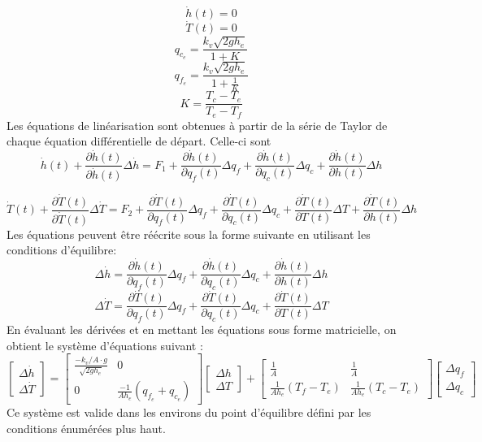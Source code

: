 \documentclass{udes_rapport} %
\begin{document}
\[ \dot{h}(t) = 0									\]
\[ \dot{T}(t) = 0									\]
\[	q_{c_e} = \frac{k_v \sqrt{2gh_e}}{1+K}			\]
\[	q_{f_e} = \frac{k_v \sqrt{2gh_e}}{1+\frac{1}{K}}\]
\[	K = \frac{T_c - T_e}{T_e -T_f} 					\]
Les équations de linéarisation sont obtenues à partir de la série de Taylor de chaque équation différentielle de départ. Celle-ci sont
\begin{equation}
\dot{h}(t) + \frac{\partial\dot{h}(t)}{\partial\dot{h}(t)}\Delta \dot h = F_1 + \frac{\partial\dot{h}(t)}{\partial q_f(t)}\Delta q_f + \frac{\partial\dot{h}(t)}{\partial q_c(t)}\Delta q_c + \frac{\partial\dot{h}(t)}{\partial h(t)}\Delta h
\end{equation}

\begin{equation}
\dot{T}(t) + \frac{\partial\dot{T}(t)}{\partial\dot{T}(t)} \Delta \dot T = F_2 + \frac{\partial\dot{T}(t)}{\partial q_f(t)}\Delta q_f + \frac{\partial\dot{T}(t)}{\partial q_c(t)}\Delta q_c + \frac{\partial\dot{T}(t)}{\partial T(t)}\Delta T+\frac{\partial\dot{T}(t)}{\partial h(t)}\Delta h
\end{equation}
Les équations peuvent être réécrite sous la forme suivante en utilisant les conditions d'équilibre:
\begin{equation}
\Delta \dot h = \frac{\partial\dot{h}(t)}{\partial q_f(t)}\Delta q_f + \frac{\partial\dot{h}(t)}{\partial q_c(t)}\Delta q_c + \frac{\partial\dot{h}(t)}{\partial h(t)}\Delta h
\end{equation}
\begin{equation}
\Delta \dot T =\frac{\partial\dot{T}(t)}{\partial q_f(t)}\Delta q_f + \frac{\partial\dot{T}(t)}{\partial q_c(t)}\Delta q_c + \frac{\partial\dot{T}(t)}{\partial T(t)}\Delta T
\end{equation}
En évaluant les dérivées et en mettant les équations sous forme matricielle, on obtient le système d'équations suivant :
$$
\begin{bmatrix}
\Delta \dot h \\
\Delta \dot T
\end{bmatrix}
=
\begin{bmatrix}
\frac{-k_v/A \cdot g}{\sqrt{2gh_e}}&0\\0&\frac{-1}{Ah_e}(q_{f_e}+q_{c_e})
\end{bmatrix}
\begin{bmatrix}
\Delta h \\
\Delta T
\end{bmatrix}
+
\begin{bmatrix}
\frac{1}{A}&\frac{1}{A}\\ \frac{1}{Ah_e}(T_f-T_e) & \frac{1}{Ah_e}(T_c-T_e)
\end{bmatrix}
\begin{bmatrix}
\Delta q_f \\
\Delta q_c
\end{bmatrix}
$$
Ce système est valide dans les environs du point d'équilibre défini par les conditions énumérées plus haut.
\end{document}
